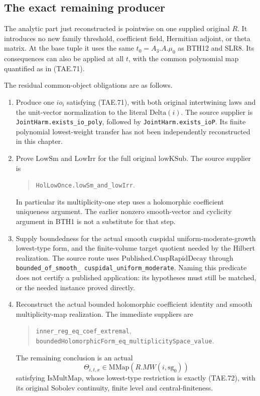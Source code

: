 \subsection*{The exact remaining producer}

The analytic part just reconstructed is pointwise on one
supplied original \(R\).  It introduces no new family
threshold, coefficient field, Hermitian adjoint, or theta
matrix.  At the base tuple it uses the same
\(t_0=A_3.A.\mu_0\) as BTH12 and SLR8.  Its consequences
can also be applied at all \(t\), with the common
polynomial map quantified as in (TAE.71).

The residual common-object obligations are as follows.
\begin{enumerate}
\item Produce one \(io_i\) satisfying (TAE.71), with both
original intertwining laws and the unit-vector
normalization to the literal \(\mathrm{Delta}(i)\).
The source supplier is
\texttt{JointHarm.exists\_\allowbreak io\_\allowbreak poly}, followed by
\texttt{JointHarm.exists\_\allowbreak ioP}.
Its finite polynomial lowest-weight transfer has not
been independently reconstructed in this chapter.
\item Prove \(\mathrm{LowSm}\) and
\(\mathrm{LowIrr}\) for the full original
\(\mathrm{lowKSub}\).
The source supplier is
\begin{quote}\small
\texttt{HolLowOnce.lowSm\_and\_lowIrr}.
\end{quote}
In particular its multiplicity-one step uses a
holomorphic coefficient uniqueness argument.
The earlier nonzero smooth-vector and cyclicity
argument in BTH1 is not a substitute for that step.
\item Supply boundedness for the actual smooth cuspidal
uniform-moderate-growth lowest-type form, and the
finite-volume target quotient needed by the Hilbert
realization.  The source route uses
\(\mathrm{Published.CuspRapidDecay}\) through
\texttt{bounded\_\allowbreak of\_\allowbreak smooth\_\allowbreak
cuspidal\_\allowbreak uniform\_\allowbreak moderate}.
Naming this predicate does not certify a published
application: its hypotheses must still be matched,
or the needed instance proved directly.
\item Reconstruct the actual bounded holomorphic
coefficient identity and smooth multiplicity-map
realization.  The immediate suppliers are
\begin{quote}\small
\texttt{inner\_reg\_eq\_coef\_extremal},\\
\texttt{boundedHolomorphicForm\_eq\_multiplicitySpace\_value}.
\end{quote}
The remaining conclusion is an actual
\[
 \Theta_{i,t,x}\in\mathrm{MMap}(R.MW(i,\mathrm{sg}_0))
\]
satisfying \(\mathrm{IsMultMap}\), whose lowest-type
restriction is exactly (TAE.72), with its original
Sobolev continuity, finite level and central-finiteness.
\end{enumerate}
